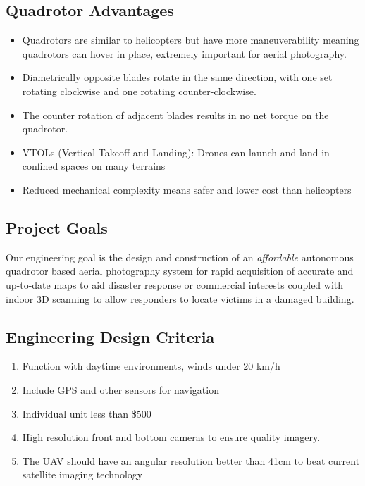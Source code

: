 \subsection{Quadrotor Advantages}
\vspace{1ex}
\begin{onehalfspacing}
	\begin{itemize}
		\item Quadrotors are similar to helicopters but have more maneuverability meaning quadrotors can hover in place, extremely important for aerial photography.
		\item Diametrically opposite blades rotate in the same direction, with one set rotating clockwise and one rotating counter-clockwise.
		\item The counter rotation of adjacent blades results in no net torque on the quadrotor.
		\item VTOLs (Vertical Takeoff and Landing): Drones can launch and land in confined spaces on many terrains
		\item Reduced mechanical complexity means safer and lower cost than helicopters
	\end{itemize}
\end{onehalfspacing}

\subsection{Project Goals}
Our engineering goal is the design and construction of an \textit{affordable} autonomous quadrotor based aerial photography system for rapid acquisition of accurate and up-to-date maps to aid disaster response or commercial interests coupled with indoor 3D scanning to allow responders to locate victims in a damaged building.

\subsection{Engineering Design Criteria}
\vspace{1ex}
\begin{onehalfspacing}
	\begin{enumerate}
		\item Function with daytime environments, winds under 20 km/h
		\item Include GPS and other sensors for navigation
		\item Individual unit less than \$500
		\item High resolution front and bottom cameras to ensure quality imagery.
		\item The UAV should have an angular resolution better than 41cm to beat current satellite imaging technology
	\end{enumerate}
\end{onehalfspacing}


